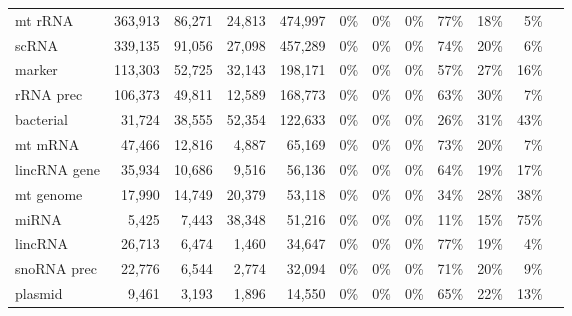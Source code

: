 \documentclass[12pt]{rockefeller}
\begin{document}
\begin{table}[h!]
\begin{adjustbox}{max width = \textwidth}
\begin{tabular}{|l|r|r|r|r|r|r|r|r|r|r|r}
        mt rRNA &     363,913 &      86,271 &     24,813 &      474,997 &                0\% &                   0\% &             0\% &                 77\% &      18\% &       5\% \\
          scRNA &     339,135 &      91,056 &     27,098 &      457,289 &                0\% &                   0\% &             0\% &                 74\% &      20\% &       6\% \\
         marker &     113,303 &      52,725 &     32,143 &      198,171 &                0\% &                   0\% &             0\% &                 57\% &      27\% &      16\% \\
      rRNA prec &     106,373 &      49,811 &     12,589 &      168,773 &                0\% &                   0\% &             0\% &                 63\% &      30\% &       7\% \\
      bacterial &      31,724 &      38,555 &     52,354 &      122,633 &                0\% &                   0\% &             0\% &                 26\% &      31\% &      43\% \\
        mt mRNA &      47,466 &      12,816 &      4,887 &       65,169 &                0\% &                   0\% &             0\% &                 73\% &      20\% &       7\% \\
   lincRNA gene &      35,934 &      10,686 &      9,516 &       56,136 &                0\% &                   0\% &             0\% &                 64\% &      19\% &      17\% \\
      mt genome &      17,990 &      14,749 &     20,379 &       53,118 &                0\% &                   0\% &             0\% &                 34\% &      28\% &      38\% \\
          miRNA &       5,425 &       7,443 &     38,348 &       51,216 &                0\% &                   0\% &             0\% &                 11\% &      15\% &      75\% \\
        lincRNA &      26,713 &       6,474 &      1,460 &       34,647 &                0\% &                   0\% &             0\% &                 77\% &      19\% &       4\% \\
    snoRNA prec &      22,776 &       6,544 &      2,774 &       32,094 &                0\% &                   0\% &             0\% &                 71\% &      20\% &       9\% \\
        plasmid &       9,461 &       3,193 &      1,896 &       14,550 &                0\% &                   0\% &             0\% &                 65\% &      22\% &      13\% \\

\end{tabular}
\end{adjustbox}
\end{table}
\end{document}
